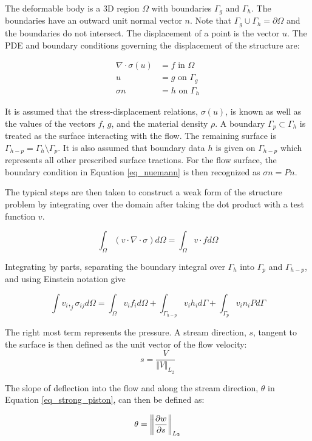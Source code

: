 \documentclass[a4paper, 12pt]{article}
\begin{document}
The deformable body is a 3D region $\Omega$ with boundaries
$\Gamma_g$ and $\Gamma_h$.
The boundaries have an outward unit normal vector $n$.
Note that $\Gamma_g \cup \Gamma_h = \partial \Omega$
and the boundaries do not intersect.
The displacement of a point is the vector $u$.
The PDE and boundary conditions governing the displacement of the structure are:

\begin{align}
\nabla \cdot \sigma(u) &= f \text{ in $\Omega$} \\
u &= g \text{ on $\Gamma_g$} \\
\sigma n &= h \text{ on $\Gamma_h$}  \label{eq_nuemann}
\end{align}

\noindent
It is assumed that the stress-displacement relations, $\sigma (u)$, is known
as well as the values of the vectors $f$, $g$, and the material density $\rho$.
A boundary $\Gamma_p \subset \Gamma_h$ is treated as the 
surface interacting with the flow. 
The remaining surface is $\Gamma_{h-p} = \Gamma_h \setminus \Gamma_p$.
It is also assumed that boundary data $h$ is given on $\Gamma_{h-p}$
which represents all other prescribed surface tractions.
For the flow surface, the boundary condition in Equation \eqref{eq_nuemann}
is then recognized as $\sigma n = P n$.

The typical steps are then taken to construct a weak form
of the structure problem
by integrating over the domain after taking the 
dot product with a test function $v$.

\begin{equation}
\int_\Omega (v \cdot \nabla \cdot \sigma) d\Omega = \int_\Omega v \cdot  f d\Omega
\end{equation}

Integrating by parts, separating the boundary integral over $\Gamma_h$
into $\Gamma_p$ and $\Gamma_{h-p}$, and using Einstein notation give

\begin{equation}
\int  v_i,_j \sigma_{ij} d\Omega = \int_\Omega v_i f_i d\Omega
  +\int_{\Gamma_{h-p}} v_i h_i d\Gamma
  +\int_{\Gamma_p} v_i n_i P d\Gamma
\end{equation}

The right most term represents the pressure.
A stream direction, $s$, tangent to the surface 
is then defined as the unit vector of the flow velocity:
\begin{equation}
s = \frac{V}{\Vert V\Vert_{L_2}}
\end{equation}

\noindent 
The slope of deflection into the flow and along the stream direction,
$\theta$ in Equation \eqref{eq_strong_piston}, can then be 
defined as:

\begin{equation}
\theta = \left\Vert\pdv{w}{s}\right\Vert_{L_2}
\end{equation}
\end{document}
